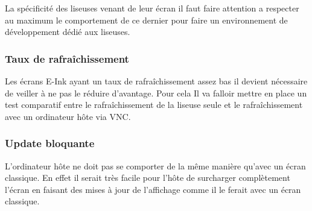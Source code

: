 La spécificité des liseuses venant de leur écran il faut faire attention a respecter au maximum le comportement de ce dernier pour faire un environnement de développement dédié aux liseuses.

\subsubsection{Taux de rafraîchissement}

Les écrans E-Ink ayant un taux de rafraîchissement assez bas il devient nécessaire de veiller à ne pas le réduire d'avantage.
Pour cela Il va falloir mettre en place un test comparatif entre le rafraîchissement de la liseuse seule et le rafraîchissement avec un ordinateur hôte via VNC.

\subsubsection{Update bloquante}

L'ordinateur hôte ne doit pas se comporter de la même manière qu'avec un écran classique. En effet il serait très facile pour l'hôte de surcharger complètement l'écran en faisant des mises à jour de l'affichage comme il le ferait avec un écran classique. %